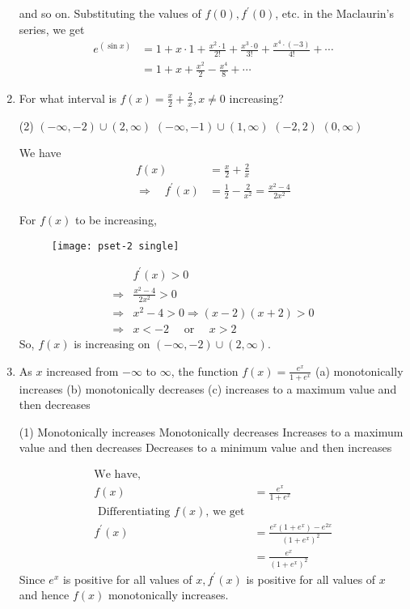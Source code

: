 \begin{enumerate}
\begin{answer}
	and so on.
	Substituting the values of $f(0), f^{\prime}(0)$, etc. in the Maclaurin's series, we get
	\begin{align*}
	e^{(\sin x)} &=1+x \cdot 1+\frac{x^{2} \cdot 1}{2 !}+\frac{x^{3} \cdot 0}{3 !}+\frac{x^{4} \cdot(-3)}{4 !}+\cdots \\
	&=1+x+\frac{x^{2}}{2}-\frac{x^{4}}{8}+\cdots
	\end{align*}
	
\end{answer}
\item For what interval is $f(x)=\frac{x}{2}+\frac{2}{x}, x \neq 0$ increasing?
\begin{tasks}(2)
	\task[\textbf{a.}] $(-\infty,-2) \cup(2, \infty)$ 
	\task[\textbf{b.}]$(-\infty,-1) \cup(1, \infty)$
	\task[\textbf{c.}]$(-2,2)$ 
	\task[\textbf{d.}] $(0, \infty)$
\end{tasks}
\begin{answer}
	We have
	\begin{align*}
	f(x) &=\frac{x}{2}+\frac{2}{x} \\
	\Rightarrow \quad f^{\prime}(x) &=\frac{1}{2}-\frac{2}{x^{2}}=\frac{x^{2}-4}{2 x^{2}}
	\end{align*}
	
	For $f(x)$ to be increasing,
	\begin{figure}[H]
	\texttt{[image: pset-2 single]}
	\end{figure}
	\begin{align*}
	& f^{\prime}(x)>0 \\
	\Rightarrow & \frac{x^{2}-4}{2 x^{2}}>0 \\
	\Rightarrow & x^{2}-4>0 \Rightarrow(x-2)(x+2)>0 \\
	\Rightarrow & x<-2 \quad \text { or } \quad x>2
	\end{align*}
	So, $f(x)$ is increasing on $(-\infty,-2) \cup(2, \infty)$.
\end{answer}
\item As $x$ increased from $-\infty$ to $\infty$, the function $f(x)=\frac{e^{x}}{1+e^{x}}$
(a) monotonically increases
(b) monotonically decreases
(c) increases to a maximum value and then decreases
\begin{tasks}(1)
	\task[\textbf{a.}]Monotonically increases 
	\task[\textbf{b.}]Monotonically decreases
	\task[\textbf{c.}]Increases to a maximum value and then decreases
	\task[\textbf{d.}]Decreases to a minimum value and then increases
\end{tasks}
\begin{answer}
	\begin{align*}
	\text{We have,}\\
	f(x)&=\frac{e^{x}}{1+e^{x}}\\
	\text{	Differentiating $f(x)$, we get}\\
	f^{\prime}(x)&=\frac{e^{x}\left(1+e^{x}\right)-e^{2 x}}{\left(1+e^{x}\right)^{2}}\\&=\frac{e^{x}}{\left(1+e^{x}\right)^{2}}
	\end{align*}
	Since $e^{x}$ is positive for all values of $x, f^{\prime}(x)$ is positive for all values of $x$ and hence $f(x)$ monotonically increases. 



\end{answer}
\end{enumerate}
